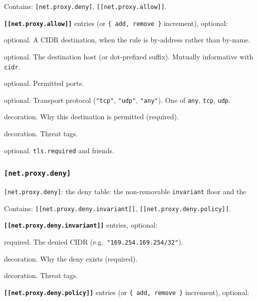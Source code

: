 Contains: \texttt{{[}net.proxy.deny{]}},
\texttt{{[}{[}net.proxy.allow{]}{]}}.

\textbf{\texttt{{[}{[}net.proxy.allow{]}{]}}} entries (or
\texttt{\{\ add,\ remove\ \}} increment), optional:

\begin{description}
\tightlist
\item[\texttt{cidr}]
optional. A CIDR destination, when the rule is by-address rather than
by-name.
\item[\texttt{name}]
optional. The destination host (or dot-prefixed suffix). Mutually
informative with \texttt{cidr}.
\item[\texttt{ports}]
optional. Permitted ports.
\item[\texttt{protocol}]
optional. Transport protocol (\texttt{"tcp"}, \texttt{"udp"},
\texttt{"any"}). One of \texttt{any}, \texttt{tcp}, \texttt{udp}.
\item[\texttt{reason}]
decoration. Why this destination is permitted (required).
\item[\texttt{threats}]
decoration. Threat tags.
\item[\texttt{tls}]
optional. \texttt{tls.required} and friends.
\end{description}

\hypertarget{net.proxy.deny}{%
\subsubsection{\texorpdfstring{\texttt{{[}net.proxy.deny{]}}}{{[}net.proxy.deny{]}}}\label{net.proxy.deny}}

\texttt{{[}net.proxy.deny{]}}: the deny table: the non-removable
\texttt{invariant} floor and the

Contains: \texttt{{[}{[}net.proxy.deny.invariant{]}{]}},
\texttt{{[}{[}net.proxy.deny.policy{]}{]}}.

\textbf{\texttt{{[}{[}net.proxy.deny.invariant{]}{]}}} entries,
optional:

\begin{description}
\tightlist
\item[\texttt{cidr}]
required. The denied CIDR (e.g.~\texttt{"169.254.169.254/32"}).
\item[\texttt{reason}]
decoration. Why the deny exists (required).
\item[\texttt{threats}]
decoration. Threat tags.
\end{description}

\textbf{\texttt{{[}{[}net.proxy.deny.policy{]}{]}}} entries (or
\texttt{\{\ add,\ remove\ \}} increment), optional:

